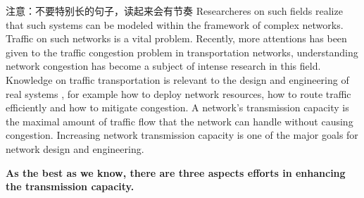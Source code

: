 \documentclass[onecolumn,preprintnumbers,amsmath,amssymb]{revtex4}
\begin{document}
注意：不要特别长的句子，读起来会有节奏
 Researcheres on such fields realize that such systems can be modeled within the framework of complex networks. Traffic on such networks is a vital problem. Recently, more attentions has been given to the traffic congestion problem in transportation networks, understanding network congestion has become a subject of intense research in this field. Knowledge on traffic transportation is relevant to the design and engineering of real systems , for example how to deploy network
resources, how to route traffic efficiently and how to mitigate congestion. A network’s transmission capacity is the maximal amount of traffic flow that the network can handle without causing congestion\cite{TORS}. Increasing network transmission capacity is one of the major goals for network design and engineering.


{\bf As the best as we know, there are three aspects efforts in  enhancing the transmission capacity.}
\end{document}
